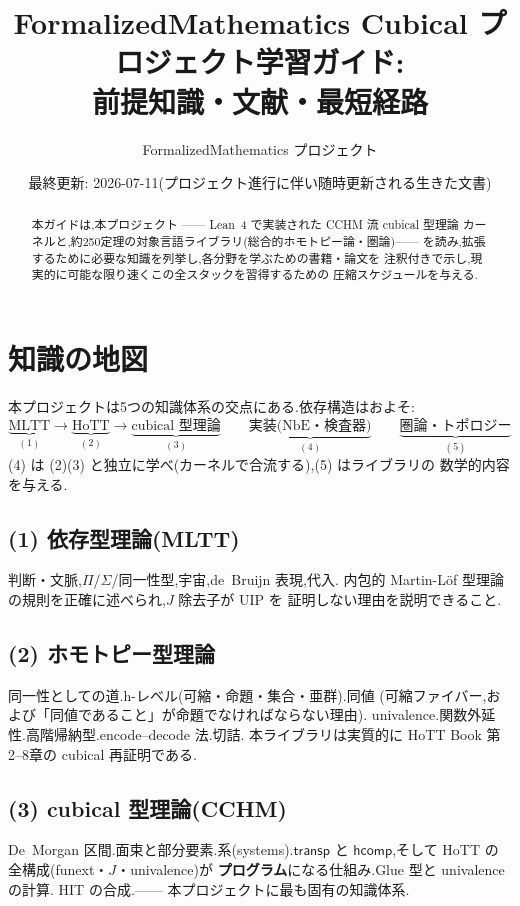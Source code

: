 \documentclass[11pt]{ltjsarticle}
\title{FormalizedMathematics Cubical プロジェクト学習ガイド:\\
前提知識・文献・最短経路}
\author{FormalizedMathematics プロジェクト}
\date{最終更新: 2026-07-11(プロジェクト進行に伴い随時更新される生きた文書)}
\newcommand{\op}[1]{\ensuremath{\mathsf{#1}}}
\begin{document}
\maketitle

\begin{abstract}
本ガイドは,本プロジェクト —— Lean~4 で実装された CCHM 流 cubical 型理論
カーネルと,約250定理の対象言語ライブラリ(総合的ホモトピー論・圏論)——
を読み,拡張するために必要な知識を列挙し,各分野を学ぶための書籍・論文を
注釈付きで示し,現実的に可能な限り速くこの全スタックを習得するための
圧縮スケジュールを与える.
\end{abstract}

\tableofcontents

\section{知識の地図}

本プロジェクトは5つの知識体系の交点にある.依存構造はおよそ:
\[
\underbrace{\text{MLTT}}_{(1)}
\longrightarrow
\underbrace{\text{HoTT}}_{(2)}
\longrightarrow
\underbrace{\text{cubical 型理論}}_{(3)}
\qquad
\underbrace{\text{実装(NbE・検査器)}}_{(4)}
\qquad
\underbrace{\text{圏論・トポロジー}}_{(5)}
\]
(4) は (2)(3) と独立に学べ(カーネルで合流する),(5) はライブラリの
数学的内容を与える.

\subsection*{(1) 依存型理論(MLTT)}
判断・文脈,$\Pi$/$\Sigma$/同一性型,宇宙,de~Bruijn 表現,代入.
内包的 Martin-L\"of 型理論の規則を正確に述べられ,$J$ 除去子が UIP を
証明しない理由を説明できること.

\subsection*{(2) ホモトピー型理論}
同一性としての道.h-レベル(可縮・命題・集合・亜群).同値
(可縮ファイバー,および「同値であること」が命題でなければならない理由).
univalence.関数外延性.高階帰納型.encode--decode 法.切詰.
本ライブラリは実質的に HoTT Book 第2--8章の cubical 再証明である.

\subsection*{(3) cubical 型理論(CCHM)}
De~Morgan 区間.面束と部分要素.系(systems).$\op{transp}$ と
$\op{hcomp}$,そして HoTT の全構成(funext・$J$・univalence)が
\textbf{プログラム}になる仕組み.Glue 型と univalence の計算.
HIT の合成.—— 本プロジェクトに最も固有の知識体系.
\end{document}
